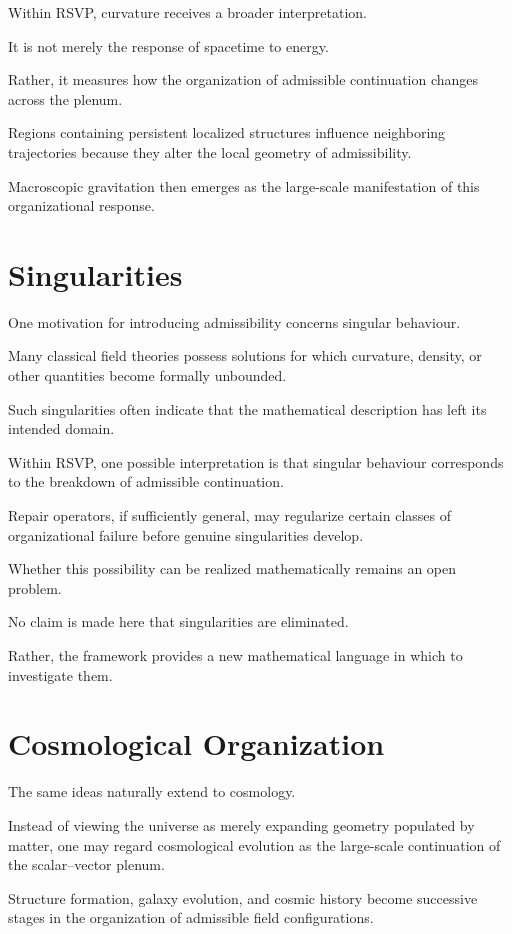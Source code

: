 \documentclass[11pt,oneside]{book}
\numberwithin{equation}{chapter}
\theoremstyle{definition}
\theoremstyle{plain}
\begin{document}
Within RSVP, curvature receives a broader interpretation.

It is not merely the response of spacetime to energy.

Rather, it measures how the organization of admissible continuation changes
across the plenum.

Regions containing persistent localized structures influence neighboring
trajectories because they alter the local geometry of admissibility.

Macroscopic gravitation then emerges as the large-scale manifestation of
this organizational response.

\section{Singularities}

One motivation for introducing admissibility concerns singular behaviour.

Many classical field theories possess solutions for which curvature,
density, or other quantities become formally unbounded.

Such singularities often indicate that the mathematical description has left
its intended domain.

Within RSVP, one possible interpretation is that singular behaviour
corresponds to the breakdown of admissible continuation.

Repair operators, if sufficiently general, may regularize certain classes
of organizational failure before genuine singularities develop.

Whether this possibility can be realized mathematically remains an open
problem.

No claim is made here that singularities are eliminated.

Rather, the framework provides a new mathematical language in which to
investigate them.

\section{Cosmological Organization}

The same ideas naturally extend to cosmology.

Instead of viewing the universe as merely expanding geometry populated by
matter, one may regard cosmological evolution as the large-scale
continuation of the scalar--vector plenum.

Structure formation, galaxy evolution, and cosmic history become successive
stages in the organization of admissible field configurations.
\end{document}
